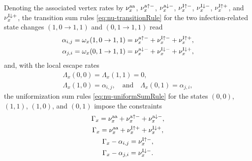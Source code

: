 \documentclass[english,10pt,aps,pra,twocolumn,superscriptaddress,floatfix,fleqn]{revtex4-2}
\newcommand{\tI}{\textnormal{I}}
\newcommand{\ta}{\textnormal{a}}
\newcommand{\taa}{\textnormal{aa}}
\let\up\uparrow
\let\dw\downarrow
\begin{document}
Denoting the associated vertex rates by $\nu^\taa_x$, $\nu^{\ta\up-}_x$, $\nu^{\ta\dw-}_x$, $\nu^{\tI\up-}_x$, $\nu^{\tI\dw-}_x$, $\nu^{\tI\up+}_x$, and $\nu^{\tI\dw+}_x$, the transition sum rules \eqref{eq:nu-transitionRule} for the two infection-related state changes $(1,0\to 1,1)$ and $(0,1\to 1,1)$
read
\begin{subequations}\label{eq:SIS-E1-trans}
\begin{align}
	\alpha_{i,j}&=\omega_x(1,0\to 1,1) = \nu^{\ta\up-}_x + \nu^{\tI\up-}_x + \nu^{\tI\up+}_x,\\
	\alpha_{j,i}&=\omega_x(0,1\to 1,1) = \nu^{\ta\dw-}_x + \nu^{\tI\dw-}_x + \nu^{\tI\dw+}_x,
\end{align}
\end{subequations}
and, with the local escape rates 
\begin{subequations}\label{eq:SIS-E-Lambda}
\begin{gather}
	\Lambda_x(0,0)=\Lambda_x(1,1)=0,\\
	\Lambda_x(1,0)=\alpha_{i,j},\quad\text{and}\quad
	\Lambda_x(0,1)=\alpha_{j,i},
\end{gather}
\end{subequations}
the uniformization sum rules \eqref{eq:nu-uniformSumRule} for the states $(0,0)$, $(1,1)$, $(1,0)$, and $(0,1)$ impose the constraints
\begin{subequations}\label{eq:SIS-E1-uni}
\begin{gather}
	\Gamma_x=\nu^\taa_x + \nu^{\ta\up-}_x + \nu^{\ta\dw-}_x,\\
	\Gamma_x=\nu^\taa_x + \nu^{\tI\up+}_x + \nu^{\tI\dw+}_x,\\
	\Gamma_x-\alpha_{i,j}=\nu^{\tI\up-}_x,\\
	\Gamma_x-\alpha_{j,i}=\nu^{\tI\dw-}_x.
\end{gather}
\end{subequations}
\end{document}
